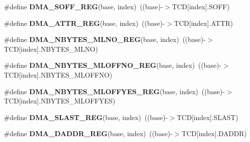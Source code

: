 \begin{DoxyCompactItemize}
\item 
\#define {\bfseries D\+M\+A\+\_\+\+S\+O\+F\+F\+\_\+\+R\+EG}(base,  index)~((base)-\/$>$T\+CD\mbox{[}index\mbox{]}.S\+O\+FF)\hypertarget{group__DMA__Register__Accessor__Macros_gacd9d9a137240bea3c222bdbdb6811311}{}\label{group__DMA__Register__Accessor__Macros_gacd9d9a137240bea3c222bdbdb6811311}

\item 
\#define {\bfseries D\+M\+A\+\_\+\+A\+T\+T\+R\+\_\+\+R\+EG}(base,  index)~((base)-\/$>$T\+CD\mbox{[}index\mbox{]}.A\+T\+TR)\hypertarget{group__DMA__Register__Accessor__Macros_ga6892f2d2baef551540d1763d734ae7d0}{}\label{group__DMA__Register__Accessor__Macros_ga6892f2d2baef551540d1763d734ae7d0}

\item 
\#define {\bfseries D\+M\+A\+\_\+\+N\+B\+Y\+T\+E\+S\+\_\+\+M\+L\+N\+O\+\_\+\+R\+EG}(base,  index)~((base)-\/$>$T\+CD\mbox{[}index\mbox{]}.N\+B\+Y\+T\+E\+S\+\_\+\+M\+L\+NO)\hypertarget{group__DMA__Register__Accessor__Macros_ga1c67b54d914f10dff1edc833f7947859}{}\label{group__DMA__Register__Accessor__Macros_ga1c67b54d914f10dff1edc833f7947859}

\item 
\#define {\bfseries D\+M\+A\+\_\+\+N\+B\+Y\+T\+E\+S\+\_\+\+M\+L\+O\+F\+F\+N\+O\+\_\+\+R\+EG}(base,  index)~((base)-\/$>$T\+CD\mbox{[}index\mbox{]}.N\+B\+Y\+T\+E\+S\+\_\+\+M\+L\+O\+F\+F\+NO)\hypertarget{group__DMA__Register__Accessor__Macros_gab232116ded8bac724f9bf9798256e399}{}\label{group__DMA__Register__Accessor__Macros_gab232116ded8bac724f9bf9798256e399}

\item 
\#define {\bfseries D\+M\+A\+\_\+\+N\+B\+Y\+T\+E\+S\+\_\+\+M\+L\+O\+F\+F\+Y\+E\+S\+\_\+\+R\+EG}(base,  index)~((base)-\/$>$T\+CD\mbox{[}index\mbox{]}.N\+B\+Y\+T\+E\+S\+\_\+\+M\+L\+O\+F\+F\+Y\+ES)\hypertarget{group__DMA__Register__Accessor__Macros_gaea5fa2373c445db5628dc17b599fea75}{}\label{group__DMA__Register__Accessor__Macros_gaea5fa2373c445db5628dc17b599fea75}

\item 
\#define {\bfseries D\+M\+A\+\_\+\+S\+L\+A\+S\+T\+\_\+\+R\+EG}(base,  index)~((base)-\/$>$T\+CD\mbox{[}index\mbox{]}.S\+L\+A\+ST)\hypertarget{group__DMA__Register__Accessor__Macros_ga012ee210e5fe3243cf0d5090d59f9b1a}{}\label{group__DMA__Register__Accessor__Macros_ga012ee210e5fe3243cf0d5090d59f9b1a}

\item 
\#define {\bfseries D\+M\+A\+\_\+\+D\+A\+D\+D\+R\+\_\+\+R\+EG}(base,  index)~((base)-\/$>$T\+CD\mbox{[}index\mbox{]}.D\+A\+D\+DR)\hypertarget{group__DMA__Register__Accessor__Macros_gae2a12a88db406b5faadfcb8ae108ad53}{}\label{group__DMA__Register__Accessor__Macros_gae2a12a88db406b5faadfcb8ae108ad53}


\end{DoxyCompactItemize}
